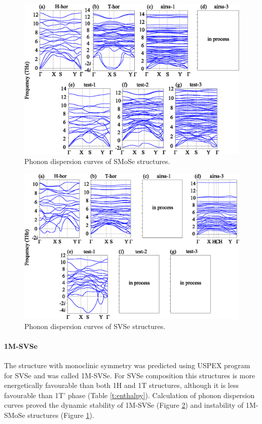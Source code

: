 \documentclass[a4paperm]{article}
\begin{document}
\begin{figure}[H]
	\includegraphics[width=\textwidth]{phon_smose.eps}
	\caption{Phonon dispersion curves of SMoSe structures.}
	\label{phon_smose}
\end{figure}

\begin{figure}[H]
	\includegraphics[width=\textwidth]{phon_svse.eps}
	\caption{Phonon dispersion curves of SVSe structures.}
	\label{phon_svse}
\end{figure}






\paragraph{1M-SVSe}


The structure with monoclinic symmetry was predicted using USPEX program for SVSe and was called 1M-SVSe. 
For SVSe composition this structures is more energetically favourable than both 1H and 1T structures, although it is less favourable than 1T' phase (Table \ref{t:enthalpy}).
Calculation of phonon dispersion curves proved the dynamic stability of 1M-SVSe (Figure \ref{phon_svse}) and instability of 1M-SMoSe structures (Figure \ref{phon_smose}).
\end{document}
